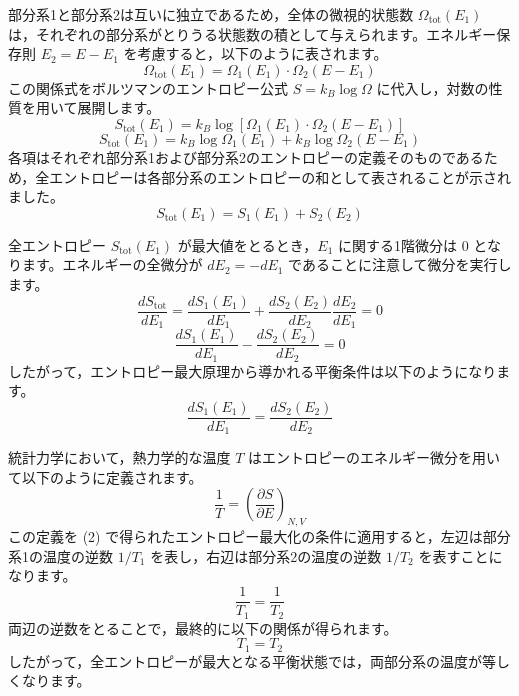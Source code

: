 \solutionheading
\begin{solutionparts}

部分系1と部分系2は互いに独立であるため，全体の微視的状態数 $\Omega_{\mathrm{tot}}(E_1)$ は，それぞれの部分系がとりうる状態数の積として与えられます。エネルギー保存則 $E_2 = E - E_1$ を考慮すると，以下のように表されます。
\begin{equation*}
\Omega_{\mathrm{tot}}(E_1) = \Omega_1(E_1) \cdot \Omega_2(E - E_1)
\end{equation*}
この関係式をボルツマンのエントロピー公式 $S = k_B \log \Omega$ に代入し，対数の性質を用いて展開します。
\begin{equation*}
S_{\mathrm{tot}}(E_1) = k_B \log \left[ \Omega_1(E_1) \cdot \Omega_2(E - E_1) \right]
\end{equation*}
\begin{equation*}
S_{\mathrm{tot}}(E_1) = k_B \log \Omega_1(E_1) + k_B \log \Omega_2(E - E_1)
\end{equation*}
各項はそれぞれ部分系1および部分系2のエントロピーの定義そのものであるため，全エントロピーは各部分系のエントロピーの和として表されることが示されました。
\begin{equation*}
S_{\mathrm{tot}}(E_1) = S_1(E_1) + S_2(E_2)
\end{equation*}

全エントロピー $S_{\mathrm{tot}}(E_1)$ が最大値をとるとき，$E_1$ に関する1階微分は 0 となります。エネルギーの全微分が $dE_2 = -dE_1$ であることに注意して微分を実行します。
\begin{equation*}
\frac{dS_{\mathrm{tot}}}{dE_1} = \frac{dS_1(E_1)}{dE_1} + \frac{dS_2(E_2)}{dE_2} \frac{dE_2}{dE_1} = 0
\end{equation*}
\begin{equation*}
\frac{dS_1(E_1)}{dE_1} - \frac{dS_2(E_2)}{dE_2} = 0
\end{equation*}
したがって，エントロピー最大原理から導かれる平衡条件は以下のようになります。
\begin{equation*}
\frac{dS_1(E_1)}{dE_1} = \frac{dS_2(E_2)}{dE_2}
\end{equation*}

統計力学において，熱力学的な温度 $T$ はエントロピーのエネルギー微分を用いて以下のように定義されます。
\begin{equation*}
\frac{1}{T} = \left( \frac{\partial S}{\partial E} \right)_{N, V}
\end{equation*}
この定義を (2) で得られたエントロピー最大化の条件に適用すると，左辺は部分系1の温度の逆数 $1/T_1$ を表し，右辺は部分系2の温度の逆数 $1/T_2$ を表すことになります。
\begin{equation*}
\frac{1}{T_1} = \frac{1}{T_2}
\end{equation*}
両辺の逆数をとることで，最終的に以下の関係が得られます。
\begin{equation*}
T_1 = T_2
\end{equation*}
したがって，全エントロピーが最大となる平衡状態では，両部分系の温度が等しくなります。

\end{solutionparts}
